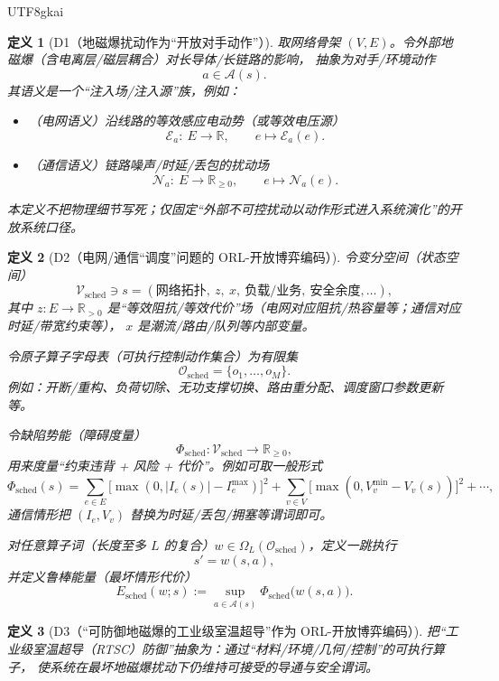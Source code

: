 \documentclass[12pt]{article}
\newtheorem{definition}{定义}[section]
\newcommand{\RR}{\mathbb{R}}
\begin{document}
\begin{CJK*}{UTF8}{gkai}
\begin{definition}[D1（地磁爆扰动作为“开放对手动作”）]
\label{def:tex27-ch16-d1}
取网络骨架 $(V,E)$。令外部地磁爆（含电离层/磁层耦合）对长导体/长链路的影响，
抽象为对手/环境动作
\[
  a\in\mathcal{A}(s).
\]
其语义是一个“注入场/注入源”族，例如：
\begin{itemize}
  \item（电网语义）沿线路的等效感应电动势（或等效电压源）
  \[
    \mathcal{E}_a:\ E\to\RR,\qquad e\mapsto \mathcal{E}_a(e).
  \]
  \item（通信语义）链路噪声/时延/丢包的扰动场
  \[
    \mathcal{N}_a:\ E\to\RR_{\ge 0},\qquad e\mapsto \mathcal{N}_a(e).
  \]
\end{itemize}
本定义不把物理细节写死；仅固定“外部不可控扰动以动作形式进入系统演化”的开放系统口径。
\end{definition}

\begin{definition}[D2（电网/通信“调度”问题的 ORL-开放博弈编码）]
\label{def:tex27-ch16-d2}
令变分空间（状态空间）
\[
  \mathcal{V}_{\mathrm{sched}}\ni
  s=(\text{网络拓扑},\ z,\ x,\ \text{负载/业务},\ \text{安全余度},\dots),
\]
其中 $z:E\to\RR_{>0}$ 是“等效阻抗/等效代价”场（电网对应阻抗/热容量等；通信对应时延/带宽约束等），
$x$ 是潮流/路由/队列等内部变量。

令原子算子字母表（可执行控制动作集合）为有限集
\[
  \mathcal{O}_{\mathrm{sched}}=\{o_1,\dots,o_M\}.
\]
例如：开断/重构、负荷切除、无功支撑切换、路由重分配、调度窗口参数更新等。

令缺陷势能（障碍度量）
\[
  \Phi_{\mathrm{sched}}:\mathcal{V}_{\mathrm{sched}}\to\RR_{\ge 0},
\]
用来度量“约束违背 + 风险 + 代价”。例如可取一般形式
\[
  \Phi_{\mathrm{sched}}(s)
  =
  \sum_{e\in E}\bigl[\max(0,|I_e(s)|-I_e^{\max})\bigr]^2
  +\sum_{v\in V}\bigl[\max(0,V_v^{\min}-V_v(s))\bigr]^2
  +\cdots,
\]
通信情形把 $(I_e,V_v)$ 替换为时延/丢包/拥塞等谓词即可。

对任意算子词（长度至多 $L$ 的复合）$w\in\Omega_L(\mathcal{O}_{\mathrm{sched}})$，定义一跳执行
\[
  s'=w(s,a),
\]
并定义鲁棒能量（最坏情形代价）
\[
  E_{\mathrm{sched}}(w;s):=\sup_{a\in\mathcal{A}(s)}\Phi_{\mathrm{sched}}\bigl(w(s,a)\bigr).
\]
\end{definition}

\begin{definition}[D3（“可防御地磁爆的工业级室温超导”作为 ORL-开放博弈编码）]
\label{def:tex27-ch16-d3}
把“工业级室温超导（RTSC）防御”抽象为：通过“材料/环境/几何/控制”的可执行算子，
使系统在最坏地磁爆扰动下仍维持可接受的导通与安全谓词。


\end{definition}
\end{CJK*}
\end{document}
